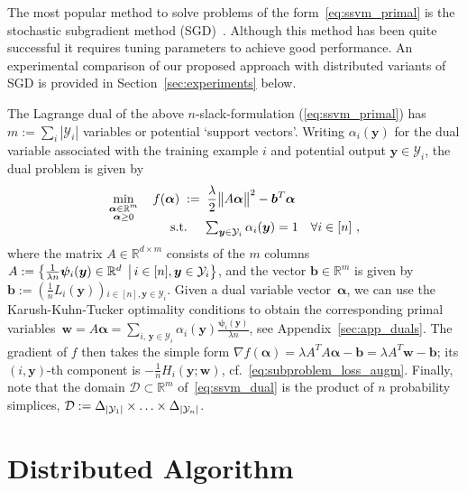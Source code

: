 \documentclass[twoside,11pt]{article}
\newcommand{\simplex}{\Delta}
\newcommand{\R}{\mathbb{R}}
\newcommand\SetOf[2]{\left\{#1\,\vphantom{#2}\right.\left|\vphantom{#1}\,#2\right\}}
\newcommand{\0}{\mathbf{0}} %
\newcommand{\bv}{\bm{b}}
\newcommand{\outputvar}{y}
\newcommand{\outputvarv}{\bm{\outputvar}}
\newcommand{\outputdomain}{\mathcal{Y}}
\newcommand{\featuremapdiff}{\psi}
\newcommand{\featuremapdiffv}{\bm{\featuremapdiff}}
\newcommand{\errorterm}{L}
\newcommand{\weight}{w}
\newcommand{\wv}{{\bm{\weight}}}
\newcommand{\dualvar}{\alpha}
\newcommand{\dualvarv}{\bm{\alpha}}
\newcommand{\domain}{\mathcal{D}} %
\begin{document}
The most popular method to solve problems of the form~\eqref{eq:ssvm_primal}
is the stochastic subgradient method (SGD)~\citep{Ratliff:2007ti,ShalevShwartz:2010cg}. Although this method has been quite successful it requires tuning parameters to achieve good performance. An experimental comparison of our proposed approach with distributed variants of SGD is provided in Section~\ref{sec:experiments} below.


The Lagrange dual of the above $n$-slack-formulation (\ref{eq:ssvm_primal}) has $m := \sum_i |\outputdomain_i|$ variables or potential `support vectors'.
Writing $\dualvar_i(\outputvarv)$ for the dual variable associated with the training example $i$ and potential output $\outputvarv \in \outputdomain_i$, the dual problem is given by
\begin{align}
    \label{eq:ssvm_dual} %
    \min_{\substack{ \dualvarv\in\R^{m} \\  \dualvarv \geq 0}} \quad  f(\dualvarv) \;:=&  \;\;
    \frac{\lambda}{2}
    \big\| A\dualvarv \big\|^2
    - \bv^T\dualvarv
    \\[-2mm]
    \text{s.t.} \quad &  \;
      \textstyle\sum_{\outputvarv \in \outputdomain_i}  \dualvar_i(\outputvarv) = 1 ~~~\forall i\in[n] \ , \notag 
\end{align}
where the matrix $A\in\R^{d\times m}$ consists of the $m$ columns $A := \SetOf{\frac1{\lambda n} \featuremapdiffv_i(\outputvarv) \in\R^d}{i\in[n],\outputvarv \in \outputdomain_i}$, and the vector $\bv \in \R^m$ is given by 
$\bv:= \left(\frac1n \errorterm_i(\outputvarv) \right)$$_{i\in[n],\outputvarv\in\outputdomain_i}$. %
Given a dual variable vector~$\dualvarv$, we can use the Karush-Kuhn-Tucker optimality conditions  to obtain the corresponding primal variables~$
\wv = A\dualvarv  = \sum_{i,\,\outputvarv \in \outputdomain_i} \dualvar_i(\outputvarv)  \frac{\featuremapdiffv_i(\outputvarv)}{\lambda n}
$, see Appendix~\ref{sec:app_duals}.
The gradient of $f$ then takes the simple form $\nabla f(\dualvarv) = \lambda A^TA\dualvarv - \bv = \lambda A^T\wv - \bv$; its \mbox{$(i,\outputvarv)$-th} component is $-\frac{1}{n} H_i(\outputvarv; \wv)$, cf.~\eqref{eq:subproblem_loss_augm}. 
Finally, note that the domain $\domain \subset \R^m$ of~\eqref{eq:ssvm_dual} is the product of $n$ probability simplices, $\domain := \simplex_{|\outputdomain_1|}\times\mathellipsis\times\simplex_{|\outputdomain_n|}$.


%
\section{Distributed Algorithm}
\end{document}
